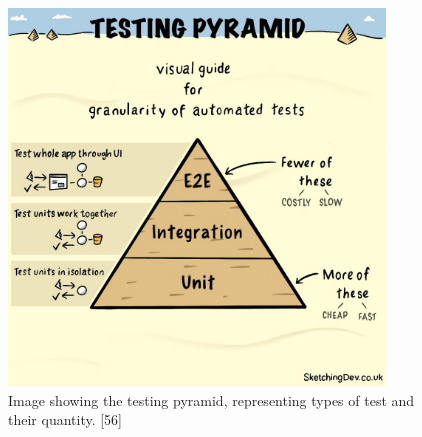   \begin{figure}[H]
    \centering
    \includegraphics[width=10cm]{assets/testingPyramid.jpg}
    \caption{Image showing the testing pyramid, representing types of test and their quantity. [56]}
    \label{fig:testingPyramid}
  \end{figure}


